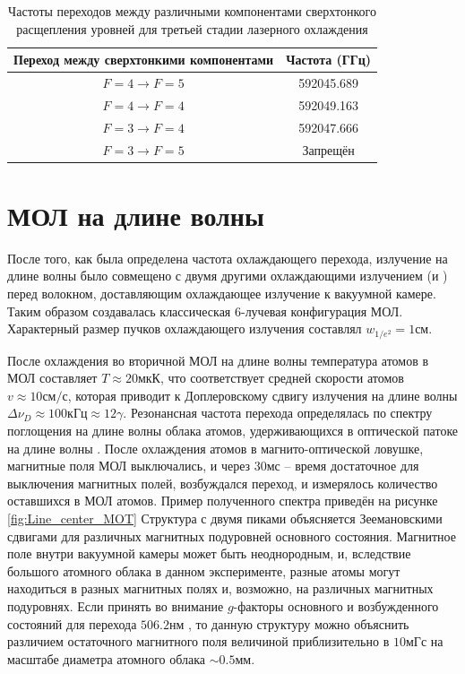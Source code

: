 \begin{table}[]
	\centering
	\begin{tabular}{|cc|}
		\hline
		Переход между сверхтонкими компонентами & Частота (ГГц)\\
		\hline
		$F = 4 \xrightarrow{} F = 5$		&  592045.689\\
		$F = 4 \xrightarrow{} F = 4$		&  592049.163\\
		$F = 3 \xrightarrow{} F = 4$ 		&  592047.666\\
		$F = 3 \xrightarrow{} F = 5$ 		&  Запрещён\\
		\hline
	\end{tabular}
	\caption{Частоты переходов между различными компонентами сверхтонкого расщепления уровней для третьей стадии лазерного охлаждения}
	\label{tab:Hyperfine506}
\end{table}


\section{МОЛ на длине волны \thd}
После того, как была определена частота охлаждающего перехода, излучение на длине волны \thd было совмещено с двумя другими охлаждающими излучением (\fst и \snd) перед волокном, доставляющим охлаждающее излучение к вакуумной камере.
Таким образом создавалась классическая 6-лучевая конфигурация МОЛ.
Характерный размер пучков охлаждающего излучения составлял $w_{1/e^2} = 1\unit{см}$.

После охлаждения во вторичной МОЛ на длине волны \snd температура атомов в МОЛ составляет $T\approx20\unit{мкК}$, что соответствует средней скорости атомов $v \approx 10\unit{см/с}$, которая приводит к Доплеровскому сдвигу излучения на длине волны \thd $\Delta\nu_D \approx 100\unit{кГц} \approx 12 \gamma$. 
Резонансная частота перехода определялась по спектру поглощения на длине волны \thd облака атомов, удерживающихся в оптической патоке на длине волны \snd. 
После охлаждения атомов в магнито-оптической ловушке, магнитные поля МОЛ выключались, и через $30\unit{мс}$ -- время достаточное для выключения магнитных полей, возбуждался переход, и измерялось количество оставшихся в МОЛ атомов.  
Пример полученного спектра приведён на рисунке \ref{fig:Line_center_MOT}
Структура с двумя пиками объясняется Зеемановскими сдвигами для различных магнитных подуровней основного состояния. 
Магнитное поле внутри вакуумной камеры может быть неоднородным, и, вследствие большого атомного облака в данном эксперименте, разные атомы могут находиться в разных магнитных полях и, возможно, на различных магнитных подуровнях.
Если принять во внимание $g$-факторы основного и возбужденного состояний для перехода $506.2 \unit{нм}$ \cite{martin1978atomic}, то данную структуру можно объяснить различием остаточного магнитного поля величиной приблизительно в $10 \unit{мГс}$ на масштабе диаметра атомного облака $\sim0.5\unit{мм}$.

